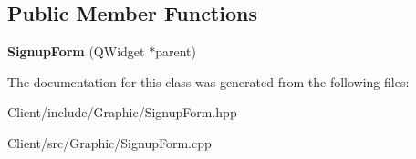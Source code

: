 \subsection*{Public Member Functions}
\begin{DoxyCompactItemize}
\item 
\mbox{\label{classbbl_1_1cli_1_1graphics_1_1_signup_form_a6125434464913bc90b4b16d054e06b33}} 
{\bfseries Signup\+Form} (Q\+Widget $\ast$parent)
\end{DoxyCompactItemize}


The documentation for this class was generated from the following files\+:\begin{DoxyCompactItemize}
\item 
Client/include/\+Graphic/Signup\+Form.\+hpp\item 
Client/src/\+Graphic/Signup\+Form.\+cpp\end{DoxyCompactItemize}
